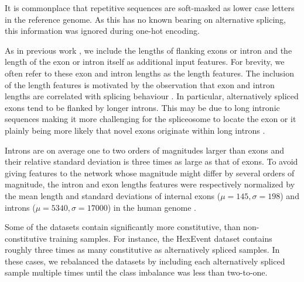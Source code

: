 It is commonplace that repetitive sequences are soft-masked as lower case letters in the reference genome. As this has no known bearing on alternative splicing, this information was ignored during one-hot encoding.

As in previous work \cite{dsc} \cite{flawed4}, we include the lengths of flanking exons or intron and the length of the exon or intron itself as additional input features. For brevity, we often refer to these exon and intron lengths as the length features. The inclusion of the length features is motivated by the observation that exon and intron lengths are correlated with splicing behaviour \cite{lengthsref1} \cite{lengthsref2}. In particular, alternatively spliced exons tend to be flanked by longer introns. This may be due to long intronic sequences making it more challenging for the spliceosome to locate the exon or it plainly being more likely that novel exons originate within long introns \cite{bestlengthsref}. 


Introns are on average one to two orders of magnitudes larger than exons and their relative standard deviation is three times as large as that of exons. To avoid giving features to the network whose magnitude might differ by several orders of magnitude, the intron and exon lengths features were respectively normalized by the mean length and standard deviations of internal exons ($\mu=145, \sigma=198$) and introns ($\mu=5340, \sigma=17000$) in the human genome \cite{exonintronlens} \cite{bionumbers}. 

Some of the datasets contain significantly more constitutive, than non-constitutive training samples. For instance, the HexEvent dataset contains roughly three times as many constitutive as alternatively spliced samples. In these cases, we rebalanced the datasets by including each alternatively spliced sample multiple times until the class imbalance was less than two-to-one. 


